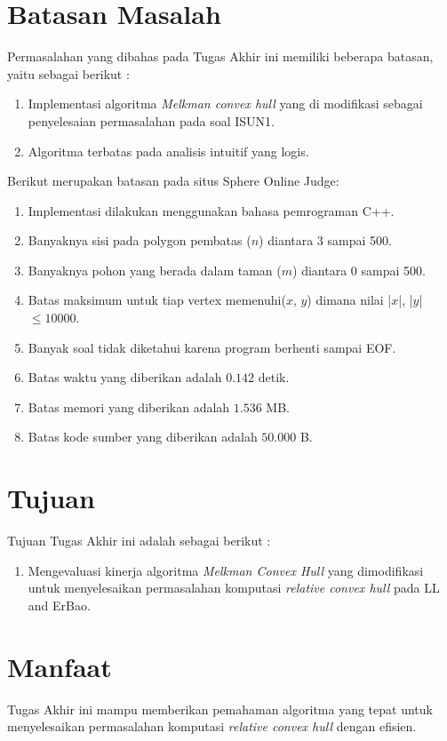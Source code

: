 \section {Batasan Masalah}
\label{sec:batasan_masalah}
Permasalahan yang dibahas pada Tugas Akhir ini memiliki beberapa batasan, yaitu sebagai berikut :
\begin{enumerate}
    \item Implementasi algoritma \textit{Melkman convex hull} yang di modifikasi sebagai penyelesaian permasalahan \RCH pada soal ISUN1.
    \item Algoritma \RCH terbatas pada analisis intuitif yang logis.
\end{enumerate}
Berikut merupakan batasan pada situs Sphere Online Judge: 
\begin {enumerate}
    \item Implementasi dilakukan menggunakan bahasa pemrograman C++.
    \item Banyaknya sisi pada polygon pembatas ($n$) diantara 3 sampai 500.
    \item Banyaknya pohon yang berada dalam taman ($m$) diantara 0 sampai 500.
    \item Batas maksimum untuk tiap vertex memenuhi($ x $, $ y $) dimana nilai |$x$|, |$y$| $\leq 10000$. 
    \item Banyak soal tidak diketahui karena program berhenti sampai EOF.
    \item Batas waktu yang diberikan adalah $ 0.142 $ detik.
    \item Batas memori yang diberikan adalah $ 1.536 $ MB.
    \item Batas kode sumber yang diberikan adalah $ 50.000 $ B. 
\end {enumerate}

\section {Tujuan}
Tujuan Tugas Akhir ini adalah sebagai berikut :
\begin{enumerate}
    \item Mengevaluasi kinerja algoritma \textit{Melkman Convex Hull} yang dimodifikasi untuk menyelesaikan permasalahan komputasi \textit{relative convex hull} pada LL and ErBao.
\end{enumerate}

\section {Manfaat}
Tugas Akhir ini mampu memberikan pemahaman algoritma yang tepat untuk menyelesaikan permasalahan komputasi \textit{relative convex hull} dengan efisien.

